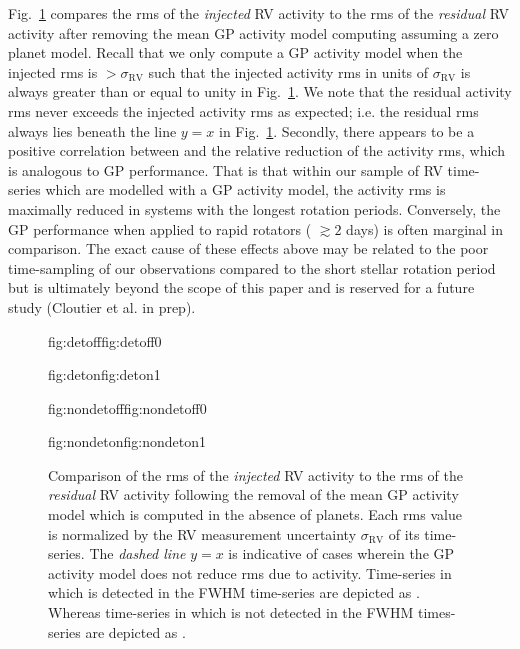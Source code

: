 Fig.~\ref{BSfig:compareGPres} compares the rms of the \emph{injected} RV activity to the rms of the \emph{residual} RV activity
after removing the mean GP activity model computing assuming a zero planet model. Recall that we only compute a GP activity model
when the injected rms is $> \sigma_{\text{RV}}$ such that the injected activity rms in units of $\sigma_{\text{RV}}$
is always greater than or equal to unity in Fig.~\ref{BSfig:compareGPres}.
We note that the residual activity rms never exceeds the injected activity rms as expected; i.e. the residual rms
always lies beneath the line $y=x$ in Fig.~\ref{BSfig:compareGPres}. Secondly,
there appears to be a positive correlation between \prot{} and the relative reduction of the activity rms,
which is analogous to GP performance. That is that within our sample of RV time-series which are modelled with a GP activity
model, the activity rms is maximally reduced in systems
with the longest rotation periods. Conversely, the GP performance when applied to rapid rotators (\prot{} $\gtrsim 2$ days)
is often marginal in comparison. The exact cause of these effects above may be related to the poor time-sampling of our
observations compared to the short stellar rotation period but is ultimately beyond the scope of this paper and is reserved
for a future study (Cloutier et al. in prep).

\begin{figure}
  \centering
  \hspace{-\hsize}%
  \begin{ocg}{fig:detoff}{fig:detoff}{0}%
  \end{ocg}%
  \begin{ocg}{fig:deton}{fig:deton}{1}%
  \end{ocg}
  \hspace{-\hsize}%
  \begin{ocg}{fig:nondetoff}{fig:nondetoff}{0}%
  \end{ocg}%
  \begin{ocg}{fig:nondeton}{fig:nondeton}{1}%
  \end{ocg}
  \hspace{-\hsize}%
  \caption{Comparison of the rms of the \emph{injected} RV activity to the rms of the \emph{residual} RV activity following
    the removal of the mean GP activity model which is
    computed in the absence of planets. Each rms value is normalized by the
    RV measurement uncertainty $\sigma_{\text{RV}}$ of its time-series. The \emph{dashed line} $y=x$ is indicative of cases
    wherein the GP activity model does not reduce rms due to activity. Time-series in which \prot{} is detected in the
    FWHM time-series are depicted as 
    . Whereas time-series in which \prot{} is not detected in
    the FWHM times-series are depicted as .}
  \label{BSfig:compareGPres}
\end{figure}


